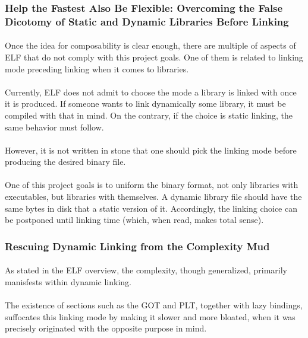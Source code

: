 \documentclass[12pt]{article}
\begin{document}
	\subsubsection{Help the Fastest Also Be Flexible: Overcoming the False Dicotomy of Static and Dynamic Libraries Before Linking}
	\paragraph{}Once the idea for composability is clear enough, there are multiple of aspects of \acrshort{ELF} that do not comply with this project goals. One of them is related to linking mode preceding linking when it comes to libraries.
	\paragraph{}Currently, \acrshort{ELF} does not admit to choose the mode a library is linked with once it is produced. If someone wants to link dynamically some library, it must be compiled with that in mind. On the contrary, if the choice is static linking,  the same behavior must follow.
	\paragraph{}However, it is not written in stone that one should pick the linking mode before producing the desired binary file.
	\paragraph{}One of this project goals is to uniform the binary format, not only libraries with executables, but libraries with themselves. A dynamic library file should have the same bytes in disk that a static version of it. Accordingly, the linking choice can be postponed until linking time (which, when read, makes total sense).
	
	\subsubsection{Rescuing Dynamic Linking from the Complexity Mud}
	\paragraph{} As stated in the \acrshort{ELF} overview, the complexity, though generalized, primarily manisfests within dynamic linking.
	\paragraph{}The existence of sections such as the \acrshort{GOT} and \acrshort{PLT}, together with lazy bindings, suffocates this linking mode by making it slower and more bloated, when it was precisely originated with the opposite purpose in mind.
\end{document}
